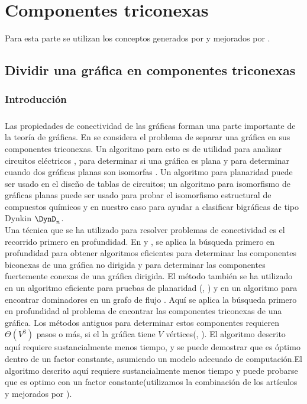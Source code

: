 \chapter{Componentes triconexas}

Para esta parte se utilizan los conceptos generados por \citep{hopcroft1973} y mejorados por \citep{Gutwenger2000ALT}.

\section{Dividir una gráfica en componentes triconexas}

\subsection{Introducción}

\paragraph{}
Las propiedades de conectividad de las gráficas forman una parte importante de la teoría de gráficas. En \citep{hopcroft1973} se considera el problema de separar una gráfica en sus componentes triconexas. Un algoritmo para esto es de utilidad para analizar circuitos eléctricos \citep{1083313} , para determinar si una gráfica es plana \citep{10893101} y para determinar cuando dos gráficas planas son isomorfas \citep{Hopcroft1972}. Un algoritmo para planaridad puede ser usado en el diseño de tablas de circuitos; un algoritmo para isomorfismo de gráficas planas puede ser usado para probar el isomorfismo estructural de compuestos químicos \citep{Lederberg1964DENDRAL64AS} y en nuestro caso para ayudar a clasificar bigráficas de tipo Dynkin $\DynD_{n}$.\\

Una técnica que se ha utilizado para resolver problemas de conectividad es el recorrido primero en profundidad. En \citep{4569669} y \citep{efalgm}, se aplica la búsqueda primero en profundidad para obtener algoritmos eficientes para determinar las componentes biconexas de una gráfica no dirigida y para determinar las componentes fuertemente conexas de una gráfica dirigida. El método también se ha utilizado en un algoritmo eficiente para pruebas de planaridad (\citep{tarjan1971efficient}, \citep{ept}) y en un algoritmo para encontrar dominadores en un grafo de flujo \citep{Tarjan1974FindingDI}. Aquí se aplica la búsqueda primero en profundidad al problema de encontrar las componentes triconexas de una gráfica. Los métodos antiguos para determinar estos componentes requieren $\Theta\left(V^{3}\right)$ pasos o más, si el la gráfica tiene $V$ vértices(\citep{1083313}, \cite{1082941}). El algoritmo descrito aquí requiere sustancialmente menos tiempo, y se puede demostrar que es óptimo dentro de un factor constante, asumiendo un modelo adecuado de computación.El algoritmo descrito aquí requiere sustancialmente menos tiempo y puede probarse que es optimo con un factor constante(utilizamos la combinación de los artículos \citep{hopcroft1973} y mejorados por \citep{Gutwenger2000ALT}).\\

